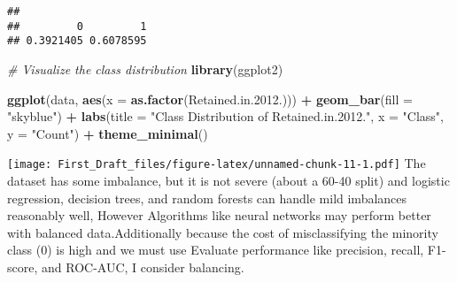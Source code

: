 \documentclass[
]{article}
\newenvironment{Shaded}{\begin{snugshade}}{\end{snugshade}}
\newcommand{\AttributeTok}[1]{\textcolor[rgb]{0.13,0.29,0.53}{#1}}
\newcommand{\CommentTok}[1]{\textcolor[rgb]{0.56,0.35,0.01}{\textit{#1}}}
\newcommand{\FloatTok}[1]{\textcolor[rgb]{0.00,0.00,0.81}{#1}}
\newcommand{\FunctionTok}[1]{\textcolor[rgb]{0.13,0.29,0.53}{\textbf{#1}}}
\newcommand{\NormalTok}[1]{#1}
\newcommand{\OtherTok}[1]{\textcolor[rgb]{0.56,0.35,0.01}{#1}}
\newcommand{\SpecialCharTok}[1]{\textcolor[rgb]{0.81,0.36,0.00}{\textbf{#1}}}
\newcommand{\StringTok}[1]{\textcolor[rgb]{0.31,0.60,0.02}{#1}}
\begin{document}
\begin{verbatim}
## 
##         0         1 
## 0.3921405 0.6078595
\end{verbatim}

\begin{Shaded}
\begin{Highlighting}[]
\CommentTok{\# Visualize the class distribution}
\FunctionTok{library}\NormalTok{(ggplot2)}

\FunctionTok{ggplot}\NormalTok{(data, }\FunctionTok{aes}\NormalTok{(}\AttributeTok{x =} \FunctionTok{as.factor}\NormalTok{(Retained.in.}\FloatTok{2012.}\NormalTok{))) }\SpecialCharTok{+}
  \FunctionTok{geom\_bar}\NormalTok{(}\AttributeTok{fill =} \StringTok{"skyblue"}\NormalTok{) }\SpecialCharTok{+}
  \FunctionTok{labs}\NormalTok{(}\AttributeTok{title =} \StringTok{"Class Distribution of Retained.in.2012."}\NormalTok{, }\AttributeTok{x =} \StringTok{"Class"}\NormalTok{, }\AttributeTok{y =} \StringTok{"Count"}\NormalTok{) }\SpecialCharTok{+}
  \FunctionTok{theme\_minimal}\NormalTok{()}
\end{Highlighting}
\end{Shaded}

\texttt{[image: First\_Draft\_files/figure-latex/unnamed-chunk-11-1.pdf]}
The dataset has some imbalance, but it is not severe (about a 60-40
split) and logistic regression, decision trees, and random forests can
handle mild imbalances reasonably well, However Algorithms like neural
networks may perform better with balanced data.Additionally because the
cost of misclassifying the minority class (0) is high and we must use
Evaluate performance like precision, recall, F1-score, and ROC-AUC, I
consider balancing.

\begin{Shaded}
\end{Shaded}
\end{document}
